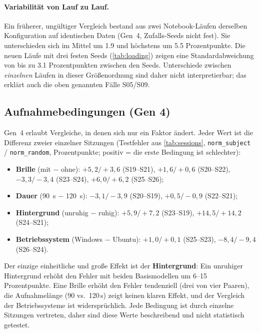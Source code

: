 \documentclass[
  11pt,
  a4paper,
  oneside,
  DIV=12,
  BCOR=8mm,
  parskip=half,
  headings=normal,
  bibliography=totoc,
  listof=totoc
]{scrreprt}
\newcommand{\code}[1]{\texttt{#1}}
\begin{document}
\paragraph{Variabilität von Lauf zu Lauf.} Ein früherer, ungültiger Vergleich
bestand aus zwei Notebook-Läufen derselben Konfiguration auf identischen Daten
(Gen~4, Zufalls-Seeds nicht fest). Sie unterschieden sich im Mittel um
\num{1,9} und höchstens um \num{5,5} Prozentpunkte. Die neuen Läufe mit drei
festen Seeds (\cref{tab:loading}) zeigen eine Standardabweichung von bis zu
\num{3,1} Prozentpunkten zwischen den Seeds. Unterschiede zwischen
\emph{einzelnen} Läufen in dieser Größenordnung sind daher nicht
interpretierbar; das erklärt auch die oben genannten Fälle S05/S09.

\subsection{Aufnahmebedingungen (Gen 4)}
\label{sec:conditions}

Gen~4 erlaubt Vergleiche, in denen sich nur ein Faktor ändert. Jeder Wert ist
die Differenz zweier einzelner Sitzungen (Testfehler aus \cref{tab:sessions},
\code{norm\_subject} / \code{norm\_random}, Prozentpunkte; positiv = die erste
Bedingung ist schlechter):
\begin{itemize}[nosep]
  \item \textbf{Brille} (mit $-$ ohne): $+5,2/+3,6$ (S19--S21),
        $+1,6/+0,6$ (S20--S22), $-3,3/-3,4$ (S23--S24), $+6,0/+6,2$ (S25--S26);
  \item \textbf{Dauer} (\SI{90}{\second} $-$ \SI{120}{\second}):
        $-3,1/-3,9$ (S20--S19), $+0,5/-0,9$ (S22--S21);
  \item \textbf{Hintergrund} (unruhig $-$ ruhig): $+5,9/+7,2$ (S23--S19),
        $+14,5/+14,2$ (S24--S21);
  \item \textbf{Betriebssystem} (Windows $-$ Ubuntu): $+1,0/+0,1$
        (S25--S23), $-8,4/-9,4$ (S26--S24).
\end{itemize}
Der einzige einheitliche und große Effekt ist der \textbf{Hintergrund}: Ein
unruhiger Hintergrund erhöht den Fehler mit beiden Basismodellen um 6--15
Prozentpunkte. Eine Brille erhöht den Fehler tendenziell (drei von vier
Paaren), die Aufnahmelänge (90 vs.\ 120\,s) zeigt keinen klaren Effekt, und
der Vergleich der Betriebssysteme ist widersprüchlich. Jede Bedingung ist
durch einzelne Sitzungen vertreten, daher sind diese Werte beschreibend und
nicht statistisch getestet.

\end{document}
